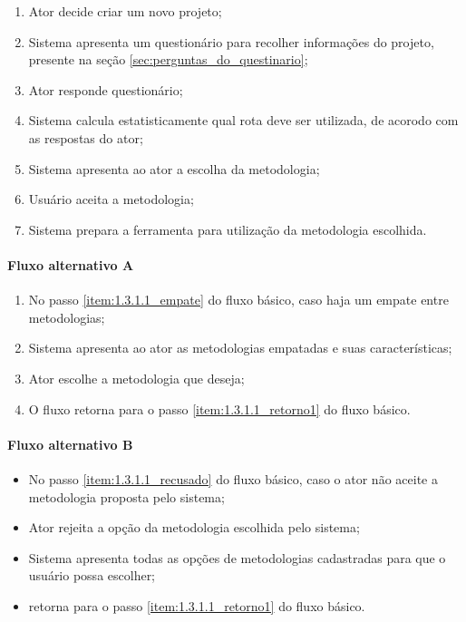 	\begin{enumerate}
		\item Ator decide criar um novo projeto;
		\item Sistema apresenta um questionário para recolher informações do projeto, presente na seção \ref{sec:perguntas_do_questinario};
		\item Ator responde questionário;
		\item Sistema calcula estatisticamente qual rota deve ser utilizada, de acorodo com as respostas do ator;
			\label{item:1.3.1.1_empate}
		\item Sistema apresenta ao ator a escolha da metodologia;
		\item Usuário aceita a metodologia;
			\label{item:1.3.1.1_recusado}
		\item Sistema prepara a ferramenta para utilização da metodologia escolhida.
			\label{item:1.3.1.1_retorno1}
	\end{enumerate}

\paragraph{Fluxo alternativo A}

	\begin{enumerate}
		\item No passo \ref{item:1.3.1.1_empate} do fluxo básico, caso haja um empate entre metodologias;
		\item Sistema apresenta ao ator as metodologias empatadas e suas características;
		\item Ator escolhe a metodologia que deseja;
		\item O fluxo retorna para o passo \ref{item:1.3.1.1_retorno1} do fluxo básico.
	\end{enumerate}

\paragraph{Fluxo alternativo B}

	\begin{itemize}
		\item No passo \ref{item:1.3.1.1_recusado} do fluxo básico, caso o ator não aceite a metodologia proposta pelo sistema;
		\item Ator rejeita a opção da metodologia escolhida pelo sistema;
		\item Sistema apresenta todas as opções de metodologias cadastradas para que o usuário possa escolher;
		\item retorna para o passo \ref{item:1.3.1.1_retorno1} do fluxo básico.
	\end{itemize}

